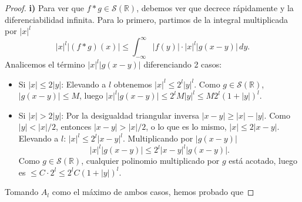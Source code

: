 \documentclass[12pt]{article}
\newcommand{\Sc}{\mathcal{S}(\mathbb{R})}
\theoremstyle{plain}
\theoremstyle{definition}
\numberwithin{equation}{section}
\begin{document}
            \begin{proof}
                \textbf{i)} Para ver que \(f * g \in \Sc\), debemos ver que decrece rápidamente y la diferenciabilidad infinita.
                Para lo primero, partimos de la integral multiplicada por \(\left\lvert x \right\rvert^l\)
                \begin{equation}
                    \label{cota_conv}
                    \left\lvert x \right\rvert^l \left\lvert (f * g)(x) \right\rvert \le \int_{-\infty}^{\infty} \left\lvert f(y) \right\rvert \cdot \left\lvert x \right\rvert^l \left\lvert g(x-y) \right\rvert \,dy.
                \end{equation}
                Analicemos el término \(\left\lvert x \right\rvert^l \left\lvert g(x-y) \right\rvert\) diferenciando 2 casos:
                \begin{itemize}
                    \item Si \(\left\lvert x \right\rvert \le 2\left\lvert y \right\rvert\): Elevando a \(l\) obtenemos \(\left\lvert x \right\rvert^l \le 2^l \left\lvert y \right\rvert^l\). Como \(g \in \Sc\), \(\left\lvert g(x-y) \right\rvert \le M\), luego \(\left\lvert x \right\rvert^l \left\lvert g(x-y) \right\rvert \le 2^l M \left\lvert y \right\rvert^l \le M 2^l (1 + \left\lvert y \right\rvert)^l\).
                    \item Si \(\left\lvert x \right\rvert > 2\left\lvert y \right\rvert\): Por la desigualdad triangular inversa \(\left\lvert x-y \right\rvert \ge \left\lvert x \right\rvert - \left\lvert y \right\rvert\). Como \(\left\lvert y \right\rvert < \left\lvert x \right\rvert/2\), entonces \(\left\lvert x-y \right\rvert > \left\lvert x \right\rvert/2\), o lo que es lo mismo, \(\left\lvert x \right\rvert \le 2\left\lvert x-y \right\rvert\). Elevando a \(l\): \(\left\lvert x \right\rvert^l \le 2^l \left\lvert x-y \right\rvert^l\). Multiplicando por \(\left\lvert g(x-y) \right\rvert\)
                    \begin{equation*}
                        \left\lvert x \right\rvert^l \left\lvert g(x-y) \right\rvert \le 2^l \left\lvert x-y \right\rvert^l \left\lvert g(x-y) \right\rvert.
                    \end{equation*}
                    Como \(g \in \Sc\), cualquier polinomio multiplicado por \(g\) está acotado, luego es \(\le C \cdot 2^l \le 2^l C (1 + \left\lvert y \right\rvert)^l\).
                \end{itemize}
                Tomando \(A_l\) como el máximo de ambos casos, hemos probado que

\end{proof}
\end{document}
